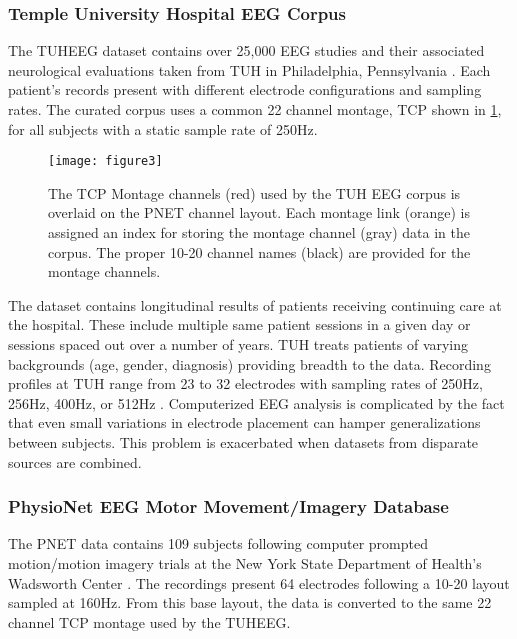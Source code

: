 \subsubsection{Temple University Hospital EEG Corpus}

The \ac{TUHEEG} dataset contains over 25,000 \ac{EEG} studies and their associated neurological evaluations taken from \ac{TUH} in Philadelphia, Pennsylvania \cite{Obeid2016a}. Each patient's records present with different electrode configurations and sampling rates. The curated corpus uses a common 22 channel montage, \ac{TCP} shown in \cref{fig:eeg1020}, for all subjects with a static sample rate of 250Hz.

\begin{figure}[ht]
\centering
\texttt{[image: figure3]}
\caption[The \acs{TCP} Montage Layout]{The \ac{TCP} Montage channels (red) used by the TUH EEG corpus is overlaid on the \ac{PNET} channel layout. Each montage link (orange) is assigned an index for storing the montage channel (gray) data in the corpus. The proper 10-20 channel names (black) are provided for the montage channels.}
\label{fig:eeg1020}
\end{figure}

The dataset contains longitudinal results of patients receiving continuing care at the hospital. These include multiple same patient sessions in a given day or sessions spaced out over a number of years. \ac{TUH} treats patients of varying backgrounds (age, gender, diagnosis) providing breadth to the data. Recording profiles at \ac{TUH} range from 23 to 32 electrodes with sampling rates of 250Hz, 256Hz, 400Hz, or 512Hz \cite{Obeid2016a}. Computerized \ac{EEG} analysis is complicated by the fact that even small variations in electrode placement can hamper generalizations between subjects. This problem is exacerbated when datasets from disparate sources are combined.

\subsubsection{PhysioNet EEG Motor Movement/Imagery Database}

The \ac{PNET} data contains 109 subjects following computer prompted motion/motion imagery trials at the New York State Department of Health's Wadsworth Center \cite{Schalk2004}. The recordings present 64 electrodes following a 10-20 layout sampled at 160Hz. From this base layout, the data is converted to the same 22 channel \ac{TCP} montage used by the \ac{TUHEEG}.

